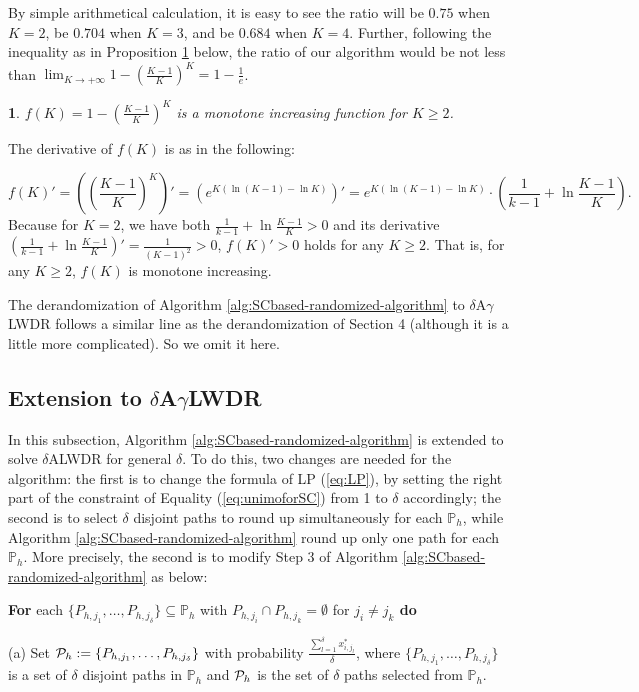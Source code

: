 \documentclass[11pt,english,onecolumn,draftcls]{IEEEtran}
\theoremstyle{plain}
\theoremstyle{plain}
\newtheorem{prop}[thm]{\protect\propositionname}
\theoremstyle{plain}
\theoremstyle{plain}
\providecommand{\propositionname}{Proposition}
\begin{document}
By simple arithmetical calculation, it is easy to see the ratio will
be $0.75$ when $K=2$, be $0.704$ when $K=3$, and be $0.684$ when
$K=4$. Further, following the inequality as in Proposition \ref{prop:calK}
below, the ratio of our algorithm would be not less than $\lim_{K\rightarrow+\infty}1-(\frac{K-1}{K})^{K}=1-\frac{1}{e}$.
\begin{prop}
\label{prop:calK}$f(K)=1-(\frac{K-1}{K})^{K}$ is a monotone increasing
function for $K\geq2$.\end{prop}
\begin{IEEEproof}
The derivative of $f(K)$ is as in the following:

\[
f(K)'=((\frac{K-1}{K})^{K})'=(e^{K(\ln(K-1)-\ln K)})'=e^{K(\ln(K-1)-\ln K)}\cdotp(\frac{1}{k-1}+\ln\frac{K-1}{K}).
\]
Because for $K=2$, we have both $\frac{1}{k-1}+\ln\frac{K-1}{K}>0$
and its derivative $(\frac{1}{k-1}+\ln\frac{K-1}{K})'=\frac{1}{(K-1)^{2}}>0$,
$f(K)'>0$ holds for any $K\geq2$. That is, for any $K\geq2$, $f(K)$
is monotone increasing.
\end{IEEEproof}
The derandomization of Algorithm \ref{alg:SCbased-randomized-algorithm}
to $\delta$A$\gamma$LWDR follows a similar line as the derandomization
of Section 4 (although it is a little more complicated). So we omit
it here.


\subsection{Extension to $\delta$A$\gamma$LWDR}

In this subsection, Algorithm \ref{alg:SCbased-randomized-algorithm}
is extended to solve $\delta$ALWDR for general $\delta$. To do this,
two changes are needed for the algorithm: the first is to change the
formula of LP (\ref{eq:LP}), by setting the right part of the constraint
of Equality (\ref{eq:unimoforSC}) from 1 to $\delta$ accordingly;
the second is to select $\delta$ disjoint paths to round up simultaneously
for each $\mathbb{P}_{h}$, while Algorithm \ref{alg:SCbased-randomized-algorithm}
round up only one path for each $\mathbb{P}_{h}$. More precisely,
the second is to modify Step 3 of Algorithm \ref{alg:SCbased-randomized-algorithm}
as below:

\textbf{For} each $\{P_{h,j_{1}},\dots,P_{h,j_{\delta}}\}\subseteq\mathbb{P}_{h}$
with $P_{h,j_{i}}\cap P_{h,j_{k}}=\emptyset$ for \textbf{$j_{i}\neq j_{k}$
do }

\quad{}(a) Set $\mathbb{{\cal P}}_{h}:=\{P_{h,j_{1}},\dots,P_{h,j_{\delta}}\}$
with probability $\frac{\sum_{l=1}^{\delta}x_{i,j_{l}}^{*}}{\delta}$,
where $\{P_{h,j_{1}},\dots,P_{h,j_{\delta}}\}$ is a set of $\delta$
disjoint paths in $\mathbb{P}_{h}$ and $\mathbb{{\cal P}}_{h}$ is
the set of $\delta$ paths selected from $\mathbb{P}_{h}$.
\end{document}
